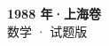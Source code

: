 \documentclass[zihao=-4, a4paper]{ctexart}
\begin{document}
\begin{center}
  {\Large\bfseries 1988 年·上海卷}\\[4pt]
  {\large 数学 · 试题版}
\end{center}
\medskip
{}

\end{document}
